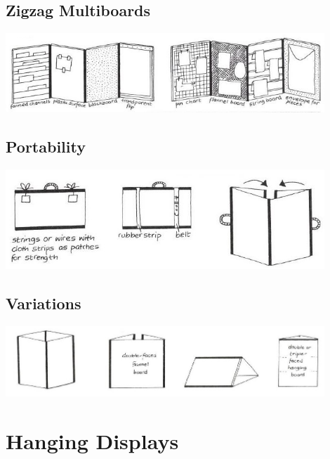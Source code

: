 \subsection{Zigzag Multiboards}

\begin{center}
\includegraphics[width=12cm]{./img/vso/zigzag.jpg}
\end{center}


\subsection{Portability}

\begin{center}
\includegraphics[width=12cm]{./img/vso/zigzag-portability.jpg}
\end{center}

\subsection{Variations}

\begin{center}
\includegraphics[width=12cm]{./img/vso/zigzag-variations.jpg}
\end{center}


\section{Hanging Displays}


